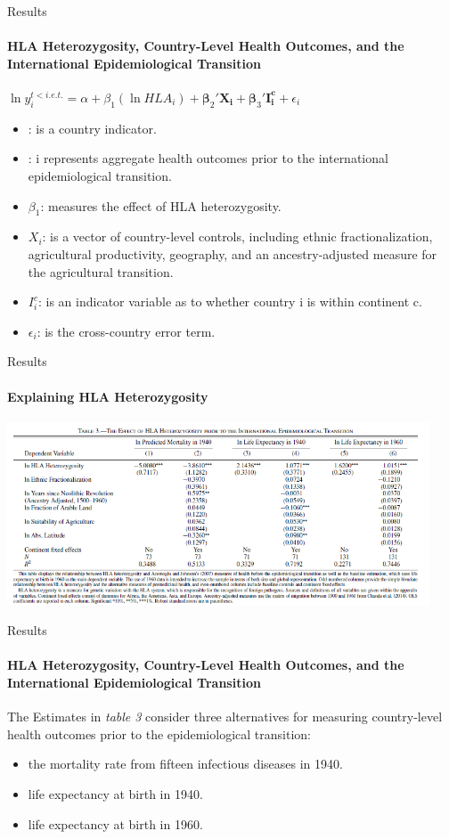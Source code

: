 \documentclass[pdftex,12pt,xcolor=pdftex,table]{beamer}
\theoremstyle{definition}
\theoremstyle{remark}
\numberwithin{equation}{section}
\numberwithin{figure}{section}
\begin{document}
\begin{frame}{Results}
\framesubtitle{HLA Heterozygosity, Country-Level Health Outcomes, and the International Epidemiological Transition}
\justifying

\centering
    $\ln y_{i}^{t<i.e.t.}=\alpha+\beta_{1}(\ln HLA_{i})+\boldsymbol{\beta}_{2}'\mathbf{X_{i}}+\boldsymbol{\beta}_{3}'\mathbf{I_{i}^{c}}+\epsilon_{i}$

\begin{itemize}
    \item {}: is a country indicator.
\item {}: i represents aggregate health outcomes prior to the international epidemiological transition.
\item \textbf{$\beta_{1}$}: measures the effect of HLA heterozygosity.
\item $X_{i}$: is a vector of country-level controls, including ethnic fractionalization, agricultural productivity, geography, and an ancestry-adjusted measure for the agricultural transition.
\item $I^{c}_{i}$: is an indicator variable as to whether country i is within continent c.
 \item {$\epsilon_{i}$}: is the cross-country error term. 
\end{itemize}
\end{frame}


\begin{frame}{Results}
\framesubtitle{Explaining HLA Heterozygosity}
\justifying
\includegraphics[height=5.45cm]{Table_3.PNG}
\end{frame}

\begin{frame}{Results}
\framesubtitle{HLA Heterozygosity, Country-Level Health Outcomes, and the International Epidemiological Transition}
\justifying
The Estimates in \textit{table 3} consider three alternatives for measuring country-level health outcomes prior to the epidemiological transition: 
\begin{itemize}
    \item the mortality rate from fifteen infectious diseases in 1940.
    \item life expectancy at birth in 1940.
    \item life expectancy at birth in 1960.
\end{itemize}
\end{frame}
\end{document}
